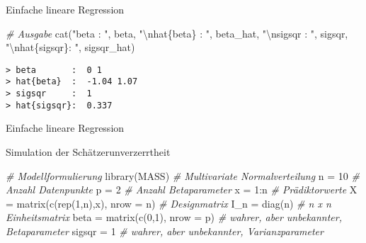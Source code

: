 \documentclass[
  8pt,
  ignorenonframetext,
]{beamer}
\newenvironment{Shaded}{\begin{snugshade}}{\end{snugshade}}
\newcommand{\AttributeTok}[1]{\textcolor[rgb]{0.77,0.63,0.00}{#1}}
\newcommand{\CommentTok}[1]{\textcolor[rgb]{0.56,0.35,0.01}{\textit{#1}}}
\newcommand{\DecValTok}[1]{\textcolor[rgb]{0.00,0.00,0.81}{#1}}
\newcommand{\FunctionTok}[1]{\textcolor[rgb]{0.00,0.00,0.00}{#1}}
\newcommand{\NormalTok}[1]{#1}
\newcommand{\OtherTok}[1]{\textcolor[rgb]{0.56,0.35,0.01}{#1}}
\newcommand{\SpecialCharTok}[1]{\textcolor[rgb]{0.00,0.00,0.00}{#1}}
\newcommand{\StringTok}[1]{\textcolor[rgb]{0.31,0.60,0.02}{#1}}
\begin{document}
\begin{frame}[fragile]{Einfache lineare Regression}
\begin{Shaded}
\begin{Highlighting}[]
\CommentTok{\# Ausgabe}
\FunctionTok{cat}\NormalTok{(}\StringTok{"beta       : "}\NormalTok{, beta,}
    \StringTok{"}\SpecialCharTok{\textbackslash{}n}\StringTok{hat\{beta\}  : "}\NormalTok{, beta\_hat,}
    \StringTok{"}\SpecialCharTok{\textbackslash{}n}\StringTok{sigsqr     : "}\NormalTok{, sigsqr,}
    \StringTok{"}\SpecialCharTok{\textbackslash{}n}\StringTok{hat\{sigsqr\}: "}\NormalTok{, sigsqr\_hat)}
\end{Highlighting}
\end{Shaded}

\begin{verbatim}
> beta       :  0 1 
> hat{beta}  :  -1.04 1.07 
> sigsqr     :  1 
> hat{sigsqr}:  0.337
\end{verbatim}
\end{frame}

\begin{frame}[fragile]{Einfache lineare Regression}
\protect\hypertarget{einfache-lineare-regression-8}{}
\vspace{1mm}

Simulation der Schätzerunverzerrtheit \vspace{2mm}

\tiny

\begin{Shaded}
\begin{Highlighting}[]
\CommentTok{\# Modellformulierung}
\FunctionTok{library}\NormalTok{(MASS)                                        }\CommentTok{\# Multivariate Normalverteilung}
\NormalTok{n          }\OtherTok{=} \DecValTok{10}                                      \CommentTok{\# Anzahl Datenpunkte}
\NormalTok{p          }\OtherTok{=} \DecValTok{2}                                       \CommentTok{\# Anzahl Betaparameter}
\NormalTok{x          }\OtherTok{=} \DecValTok{1}\SpecialCharTok{:}\NormalTok{n                                     }\CommentTok{\# Prädiktorwerte}
\NormalTok{X          }\OtherTok{=} \FunctionTok{matrix}\NormalTok{(}\FunctionTok{c}\NormalTok{(}\FunctionTok{rep}\NormalTok{(}\DecValTok{1}\NormalTok{,n),x), }\AttributeTok{nrow =}\NormalTok{ n)         }\CommentTok{\# Designmatrix}
\NormalTok{I\_n        }\OtherTok{=} \FunctionTok{diag}\NormalTok{(n)                                 }\CommentTok{\# n x n Einheitsmatrix}
\NormalTok{beta       }\OtherTok{=} \FunctionTok{matrix}\NormalTok{(}\FunctionTok{c}\NormalTok{(}\DecValTok{0}\NormalTok{,}\DecValTok{1}\NormalTok{), }\AttributeTok{nrow =}\NormalTok{ p)                }\CommentTok{\# wahrer, aber unbekannter, Betaparameter}
\NormalTok{sigsqr     }\OtherTok{=} \DecValTok{1}                                       \CommentTok{\# wahrer, aber unbekannter, Varianzparameter}


\end{Highlighting}
\end{Shaded}
\end{frame}
\end{document}
